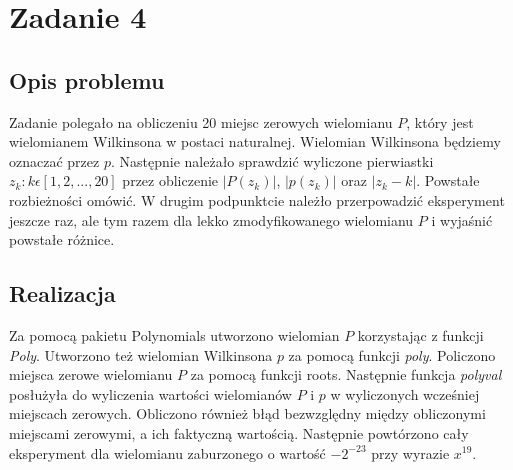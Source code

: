 \documentclass[]{article}
\begin{document}
\section{Zadanie 4}
\subsection{Opis problemu}
Zadanie polegało na obliczeniu 20 miejsc zerowych wielomianu $P$, który jest wielomianem Wilkinsona w postaci naturalnej. Wielomian Wilkinsona będziemy oznaczać przez $p$. Następnie należało sprawdzić wyliczone pierwiastki $z_k : k \epsilon [1, 2, ... , 20]$ przez obliczenie $|P(z_k)|$, $|p(z_k)|$ oraz $|z_k - k|$. Powstałe rozbieżności omówić. W drugim podpunktcie należło przerpowadzić eksperyment jeszcze raz, ale tym razem dla lekko zmodyfikowanego wielomianu $P$ i wyjaśnić powstałe różnice. 
\subsection{Realizacja}
Za pomocą pakietu Polynomials utworzono wielomian $P$ korzystając z funkcji \textit{Poly}. Utworzono też wielomian Wilkinsona $p$ za pomocą funkcji \textit{poly}. Policzono miejsca zerowe wielomianu $P$ za pomocą funkcji roots. Następnie funkcja \textit{polyval} posłużyła do wyliczenia wartości wielomianów $P$ i $p$ w wyliczonych wcześniej miejscach zerowych. Obliczono również błąd bezwzględny między obliczonymi miejscami zerowymi, a ich faktyczną wartością. Następnie powtórzono cały eksperyment dla wielomianu zaburzonego o wartość $-2^{-23}$ przy wyrazie $x^19$.  
\end{document}

